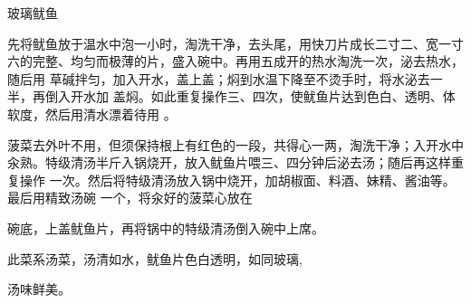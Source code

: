\begin{recipe}{玻璃鱿鱼}

\ingredients


\preparation

\step 先将鱿鱼放于温水中泡一小时，淘洗干净，去头尾，用快刀片成长二寸二、宽一寸
六的完整、均匀而极薄的片，盛入碗中。再用五成开的热水淘洗一次，泌去热水，随后用
草碱拌匀，加入开水，盖上盖；焖到水温下降至不烫手时，将水泌去一半，再倒入开水加
盖焖。如此重复操作三、四次，使鱿鱼片达到色白、透明、体软度，然后用清水漂着待用
。

\step 菠菜去外叶不用，但须保持根上有红色的一段，共得心一两，淘洗干净；入开水中
汆熟。特级清汤半斤入锅烧开，放入鱿鱼片喂三、四分钟后泌去汤；随后再这样重复操作
一次。然后将特级清汤放入锅中烧开，加胡椒面、料酒、妹精、酱油等。最后用精致汤碗
一个，将汆好的菠菜心放在

碗底，上盖鱿鱼片，再将锅中的特级清汤倒入碗中上席。

\features

此菜系汤菜，汤清如水，鱿鱼片色白透明，如同玻璃,

汤味鲜美。

\end{recipe}

